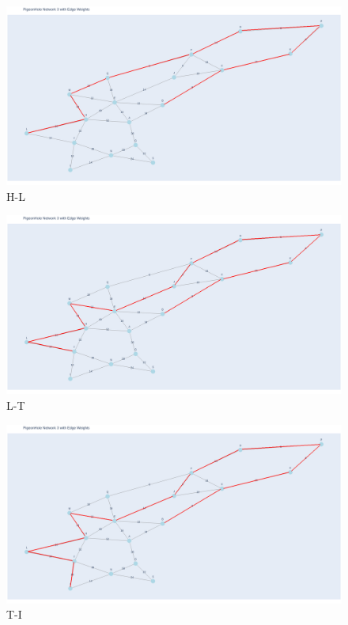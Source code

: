 \documentclass[11pt]{book}
\renewcommand{\=}[1]{\stackrel{#1}{=}} %
\theoremstyle{definition}
\theoremstyle{remark}
\begin{document}
\begin{figure}
    \centering
    \includegraphics[width=1\linewidth]{q5_plots/10.png}
    \caption{H-L}
    \label{fig:enter-label}
\end{figure}
\begin{figure}
    \centering
    \includegraphics[width=1\linewidth]{q5_plots/11.png}
    \caption{L-T}
    \label{fig:enter-label}
\end{figure}
\begin{figure}
    \centering
    \includegraphics[width=1\linewidth]{q5_plots/12.png}
    \caption{T-I}
    \label{fig:enter-label}
\end{figure}
\end{document}
